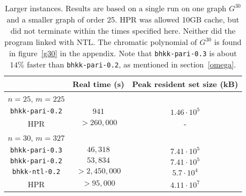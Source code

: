 \documentclass{cslthse-msc}
\newcommand{\code}{\texttt}
\begin{document}
\begin{table}[H]\centering
\begin{tabular}{c|cc} \hline
  & Real time (s) & Peak resident set size (kB) \\ \hline
  $n = 25$, $m = 225$ & & \\ \hline
  \code{bhkk-pari-0.2} & $941$ & $1.46 \cdot 10^{5}$ \\ \hline
  HPR & $> 260,000$ & - \\ \hline
  $n = 30$, $m = 327$ & &  \\ \hline
  \code{bhkk-pari-0.3} & $46,318$ & $7.41 \cdot 10^{5}$ \\ \hline
  \code{bhkk-pari-0.2} & $53,834$ & $7.41 \cdot 10^{5}$ \\ \hline
  \code{bhkk-ntl-0.2} & $> 2,450,000$ & $5.7 \cdot 10^{4}$ \\ \hline
  HPR & $> 95,000$ & $4.11 \cdot 10^{7}$ \\ \hline
\end{tabular}
\caption{Larger instances. Results are based on a single run on one graph $G^{30}$ and a smaller graph of order 25. HPR was allowed 10GB cache, but did not terminate within the times specified here. Neither did the program linked with NTL. The chromatic polynomial of $G^{30}$ is found in figure~\ref{g30} in the appendix. Note that \code{bhkk-pari-0.3} is about $14\%$ faster than \code{bhkk-pari-0.2}, as mentioned in section~\ref{omega}.}
\label{largeinstances}
\end{table}
\end{document}
